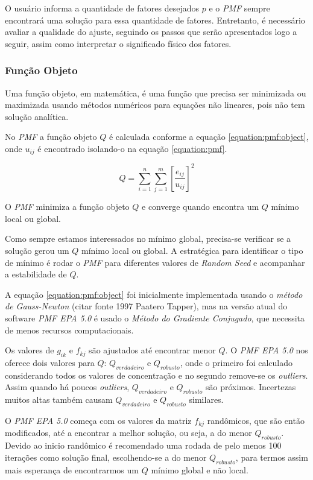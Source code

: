 O usuário informa a quantidade de fatores desejados $p$ e o \textit{PMF} 
sempre encontrará uma solução para essa quantidade de fatores. 
Entretanto, é necessário avaliar a qualidade do ajuste, seguindo os passos 
que serão apresentados logo a seguir, assim como interpretar o significado 
físico dos fatores. 

\subsubsection{Função Objeto}

Uma função objeto, em matemática, é uma função que precisa ser minimizada 
ou maximizada usando métodos numéricos para equações não lineares, pois não 
tem solução analítica. 

No \textit{PMF} a função objeto $Q$ é calculada conforme a equação 
\ref{equation:pmf:object}, onde ${u_{ij}}$ é encontrado isolando-o na 
equação \ref{equation:pmf}.

\begin{equation}
  Q = \sum_{i=1}^n \sum_{j=1}^m  \left[ \frac{e_{ij}} {u_{ij}} \right] ^2
  \label{equation:pmf:object}
\end{equation}

O \textit{PMF} minimiza a função objeto $Q$ e converge quando encontra um $Q$ 
mínimo local ou global. 

Como sempre estamos interessados no mínimo global, precisa-se verificar se a 
solução gerou um $Q$ mínimo local ou global. A estratégica para identificar
o tipo de mínimo é rodar o \textit{PMF} para diferentes valores de 
\textit{Random Seed} e acompanhar a estabilidade de $Q$.

A equação \ref{equation:pmf:object} foi inicialmente implementada usando 
o \textit{método de Gauss-Newton}  (citar fonte 1997 Paatero Tapper), mas na 
versão atual do software \textit{PMF EPA 5.0} é usado o 
\textit{Método do Gradiente Conjugado}, que necessita de menos recursos 
computacionais. 

Os valores de $g_{ik}$ e $f_{kj}$ são ajustados até encontrar menor $Q$. 
O \textit{PMF EPA 5.0} nos oferece dois valores para $Q$: $Q_{verdadeiro}$ e 
$Q_{robusto}$, onde o primeiro foi calculado considerando todos os valores 
de concentração e no segundo remove-se os \textit{outliers}.
Assim quando há poucos \textit{outliers}, $Q_{verdadeiro}$ e $Q_{robusto}$ 
são próximos. Incertezas muitos altas também causam $Q_{verdadeiro}$ e 
$Q_{robusto}$ similares.

O \textit{PMF EPA 5.0} começa com os valores da matriz $f_{kj}$ randômicos, 
que são então modificados, até a encontrar a melhor solução, ou seja, 
a do menor $Q_{robusto}$. 
Devido ao inicio randômico é recomendado uma rodada de pelo menos 100 iterações 
como solução final, escolhendo-se a do menor $Q_{robusto}$, para termos assim 
mais esperança de encontrarmos um $Q$ mínimo global e não local.

